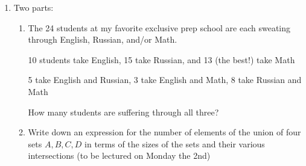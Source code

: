 \documentclass[12pt]{article}
\begin{document}
\begin{enumerate}
\begin{enumerate}
\end{enumerate}

\newpage

\item  Two parts:

\begin{enumerate}
\item The 24 students at my favorite exclusive prep school are each sweating through English, Russian, and/or Math.

10 students take English, 15 take Russian, and 13 (the best!) take Math

5 take English and Russian, 3 take English and Math, 8 take Russian and Math

How many students are suffering through all three?

\item Write down an expression for the number of elements of the union of four sets $A,B,C,D$ in terms of the sizes of the sets and their various intersections (to be lectured on Monday the 2nd)

\end{enumerate}

\end{enumerate}
\end{document}
